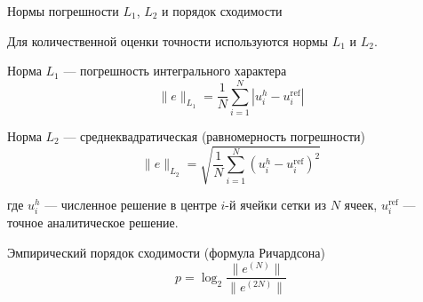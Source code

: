 \documentclass[ignoreonframetext,unicode,aspectratio=169]{beamer}
\begin{document}
	\appendix
	
	
	
	
	
	
	
	
	
	
\begin{frame}{Нормы погрешности $L_1$, $L_2$ и порядок сходимости}
	
	Для количественной оценки точности используются нормы $L_1$ и $L_2$.
	
	\vspace{0.2cm}
	\begin{block}{Норма $L_1$ --- погрешность интегрального характера}
		\[
		\|e\|_{L_1} = \frac{1}{N} \sum_{i=1}^{N}
		\left| u_i^h - u_i^{\mathrm{ref}} \right|
		\]
	\end{block}
	
	\begin{block}{Норма $L_2$ --- среднеквадратическая (равномерность погрешности)}
		\[
		\|e\|_{L_2} = \sqrt{\frac{1}{N} \sum_{i=1}^{N}
			\left( u_i^h - u_i^{\mathrm{ref}} \right)^2}
		\]
	\end{block}
	
	{\small где $u_i^h$ --- численное решение в центре $i$-й ячейки сетки
		из $N$ ячеек, $u_i^{\mathrm{ref}}$ --- точное аналитическое решение.}
	
	\vspace{0.2cm}
	\begin{block}{Эмпирический порядок сходимости (формула Ричардсона)}
		\[
		p = \log_2 \frac{\|e^{(N)}\|}{\|e^{(2N)}\|}
		\]
	\end{block}
	
\end{frame}
\end{document}
